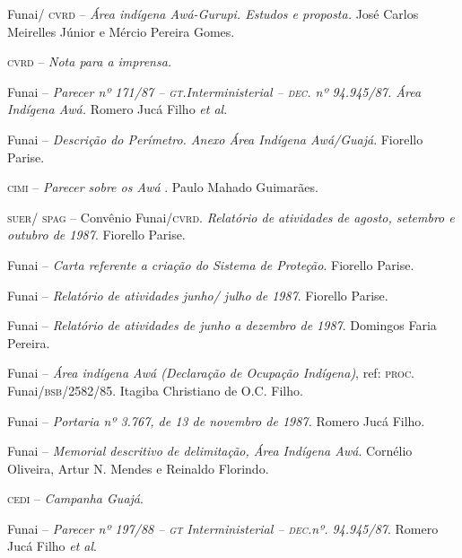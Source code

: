 \begin{itemize}
{\item[1985] Funai/ \textsc{cvrd} -- \emph{Área indígena Awá-Gurupi. Estudos e
proposta.} José Carlos Meirelles Júnior e Mércio Pereira Gomes.

\item[1985] \textsc{cvrd} -- \emph{Nota para a imprensa.}

\item[1987] Funai -- \emph{Parecer nº 171/87 -- \textsc{gt}.Interministerial
-- \textsc{dec}. nº 94.945/87. Área Indígena Awá.} Romero Jucá Filho \emph{et
al}.

\item[1987] Funai -- \emph{Descrição do Perímetro. Anexo Área Indígena
Awá/Guajá}. Fiorello Parise.

\item[1987] \textsc{cimi} -- \emph{Parecer sobre os Awá} . Paulo Mahado
Guimarães.

\item[1987] \textsc{suer}/ \textsc{spag} -- Convênio Funai/\textsc{cvrd}. \emph{Relatório de
atividades de agosto, setembro e outubro de 1987}. Fiorello Parise.

\item[1987] Funai -- \emph{Carta referente a criação do Sistema de
Proteção}. Fiorello Parise.

\item[1987] Funai -- \emph{Relatório de atividades junho/ julho de
1987}. Fiorello Parise.

\item[1987] Funai -- \emph{Relatório de atividades de junho a dezembro
de 1987}. Domingos Faria Pereira.

\item[1987] Funai -- \emph{Área indígena Awá (Declaração de Ocupação
Indígena)}, ref: \textsc{proc}. Funai/\textsc{bsb}/2582/85. Itagiba Christiano de O.C.
Filho.

\item[1987] Funai -- \emph{Portaria nº 3.767, de 13 de novembro de 1987.} Romero Jucá Filho.

\item[1987] Funai -- \emph{Memorial descritivo de delimitação, Área
Indígena Awá}. Cornélio Oliveira, Artur N. Mendes e Reinaldo Florindo.

\item[1987] \textsc{cedi} -- \emph{Campanha Guajá}.

\item[1988] Funai -- \emph{Parecer nº 197/88 -- \textsc{gt} Interministerial
-- \textsc{dec}.nº. 94.945/87}. Romero Jucá Filho \emph{et al}.

}
\end{itemize}
